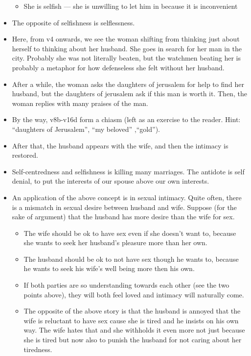 \begin{itemize}
{\begin{itemize}
    \item{She is selfish --- she is unwilling to let him in because it is inconvenient}
  \end{itemize}}
  \item{The opposite of selfishness is selflessness.}
  \item{Here, from v4 onwards, we see the woman shifting from thinking just about herself to thinking about her husband. She goes in search for her man in the city. Probably she was not literally beaten, but the watchmen beating her is probably a metaphor for how defenseless she felt without her husband.}
  \item{After a while, the woman asks the daughters of jerusalem for help to find her husband, but the daughters of jerusalem ask if this man is worth it. Then, the woman replies with many praises of the man.}
  \item{By the way, v8b-v16d form a chiasm (left as an exercise to the reader. Hint: ``daughters of Jerusalem'', ``my beloved'' ,``gold'').}
  \item{After that, the husband appears with the wife, and then the intimacy is restored.}
  \item{Self-centredness and selfishness is killing many marriages. The antidote is self denial, to put the interests of our spouse above our own interests. }
  \item{An application of the above concept is in sexual intimacy. Quite often, there is a mismatch in sexual desire between husband and wife. Suppose (for the sake of argument) that the husband has more desire than the wife for sex. 
  \begin{itemize}
    \item{The wife should be ok to have sex even if she doesn’t want to, because she wants to seek her husband’s pleasure more than her own.}
    \item{The husband should be ok to not have sex though he wants to, because he wants to seek his wife’s well being more then his own.}
    \item{If both parties are so understanding towards each other (see the two points above), they will both feel loved and intimacy will naturally come.}
    \item{The opposite of the above story is that the husband is annoyed that the wife is reluctant to have sex cause she is tired and he insists on his own way. The wife hates that and she withholds it even more not just because she is tired but now also to punish the husband for not caring about her tiredness.}

\end{itemize}}
\end{itemize}

